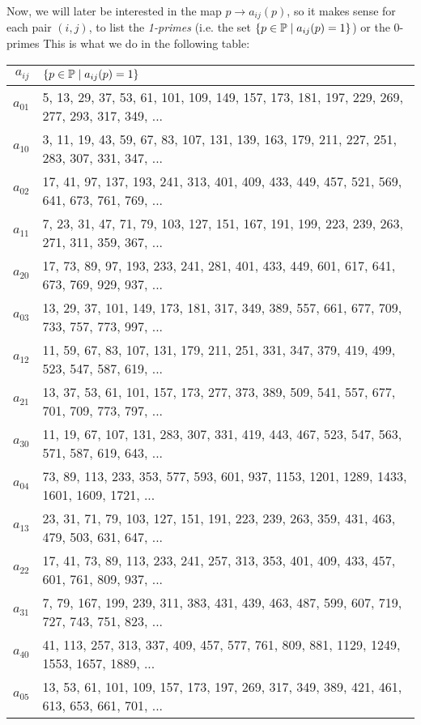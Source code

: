 Now, we will later be interested in the map $p \to a_{ij}(p)$, so it makes sense for each pair $(i,j)$, to list the \textit{1-primes} (i.e. the set $\{ p \in \mathbb{P} \mid a_{ij}(p) = 1 \}$) or the 0-primes 
This is what we do in the following table:
\begin{center}
	\begin{tabular}{|r|l|}
		\hline
		\textbf{$a_{ij}$} & \textbf{$ \lbrace p \in \mathbb{P} \mid a_{ij}(p) = 1 \rbrace $} \\
		\hline
		$ a_{0 1} $ & 5, 13, 29, 37, 53, 61, 101, 109, 149, 157, 173, 181, 197, 229, 269, 277, 293, 317, 349, ...\\
		$ a_{1 0} $ & 3, 11, 19, 43, 59, 67, 83, 107, 131, 139, 163, 179, 211, 227, 251, 283, 307, 331, 347, ...\\    
		$ a_{0 2} $ & 17, 41, 97, 137, 193, 241, 313, 401, 409, 433, 449, 457, 521, 569, 641, 673, 761, 769, ...\\
		$ a_{1 1} $ & 7, 23, 31, 47, 71, 79, 103, 127, 151, 167, 191, 199, 223, 239, 263, 271, 311, 359, 367, ...\\
		$ a_{2 0} $ & 17, 73, 89, 97, 193, 233, 241, 281, 401, 433, 449, 601, 617, 641, 673, 769, 929, 937, ...\\
		$ a_{0 3} $ & 13, 29, 37, 101, 149, 173, 181, 317, 349, 389, 557, 661, 677, 709, 733, 757, 773, 997, ...\\
		$ a_{1 2} $ & 11, 59, 67, 83, 107, 131, 179, 211, 251, 331, 347, 379, 419, 499, 523, 547, 587, 619, ...\\
		$ a_{2 1} $ & 13, 37, 53, 61, 101, 157, 173, 277, 373, 389, 509, 541, 557, 677, 701, 709, 773, 797, ...\\
		$ a_{3 0} $ & 11, 19, 67, 107, 131, 283, 307, 331, 419, 443, 467, 523, 547, 563, 571, 587, 619, 643, ...\\
		$ a_{0 4} $ & 73, 89, 113, 233, 353, 577, 593, 601, 937, 1153, 1201, 1289, 1433, 1601, 1609, 1721, ...\\
		$ a_{1 3} $ & 23, 31, 71, 79, 103, 127, 151, 191, 223, 239, 263, 359, 431, 463, 479, 503, 631, 647, ...\\
		$ a_{2 2} $ & 17, 41, 73, 89, 113, 233, 241, 257, 313, 353, 401, 409, 433, 457, 601, 761, 809, 937, ...\\
		$ a_{3 1} $ & 7, 79, 167, 199, 239, 311, 383, 431, 439, 463, 487, 599, 607, 719, 727, 743, 751, 823, ...\\
		$ a_{4 0} $ & 41, 113, 257, 313, 337, 409, 457, 577, 761, 809, 881, 1129, 1249, 1553, 1657, 1889, ...\\
		$ a_{0 5} $ & 13, 53, 61, 101, 109, 157, 173, 197, 269, 317, 349, 389, 421, 461, 613, 653, 661, 701, ...\\

\end{tabular}
\end{center}
